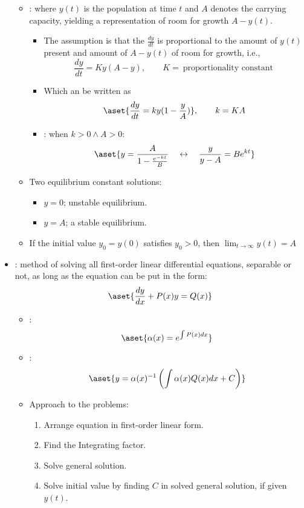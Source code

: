 \begin{itemize}
\begin{itemize}
  \item {}: where \(y(t)\) is the population
    at time \(t\) and \(A\) denotes the carrying capacity, yielding a
    representation of room for growth \(A-y (t) \).
    \begin{itemize}
      \item The assumption is that the \(\frac{dy}{dt} \) is proportional to
        the amount of \(y (t) \) present and amount of \(A - y (t) \) of room
        for growth, i.e.,
        \[%
          \frac{dy}{dt} = Ky(A-y), \qquad K = ~\text{proportionality constant}~
        \]%
      \item Which an be written as
        \[%
          \aset{\frac{dy}{dt} = ky(1-\frac{y}{A})}, \qquad k = KA
        \]%
      \item {}: when \(k > 0 \land A > 0\):
        \[%
          \aset{y = \frac{A}{1-\frac{e^{-kt}}{B}}
          \quad\leftrightarrow\quad
        \frac{y}{y-A} = Be^{kt}}
        \]%
    \end{itemize}

  \item Two equilibrium constant solutions:
    \begin{itemize}
      \item \( y= 0\); unstable equilibrium.
      \item \(y=A\); a stable equilibrium.
    \end{itemize}

  \item If the initial value \(y_0 = y(0) \) satisfies \(y_0 > 0\), then
    \(\lim_{t \to \infty} y (t) = A\)
  \end{itemize}
  \newpage

  \item {}: method of solving all first-order
    linear differential equations, separable or not, as long as the equation
    can be put in the form:
    \[%
      \aset{\frac{dy}{dx} + P(x)y = Q(x)}
    \]%
    \begin{itemize}
      \item {}:
        \[%
          \aset{\alpha (x) = e^{\int P(x) dx}}
        \]%
      \item {}:
        \[%
          \aset{y = \alpha (x)^{-1} \left( \int \alpha (x) Q (x) dx + C \right)}
        \]%
      \item Approach to the problems:
        \begin{enumerate}
          \item Arrange equation in first-order linear form.
          \item Find the Integrating factor.
          \item Solve general solution.
          \item Solve initial value by finding \(C\) in solved general
            solution, if given \(y(t)\).
        \end{enumerate}
    \end{itemize}


\end{itemize}
